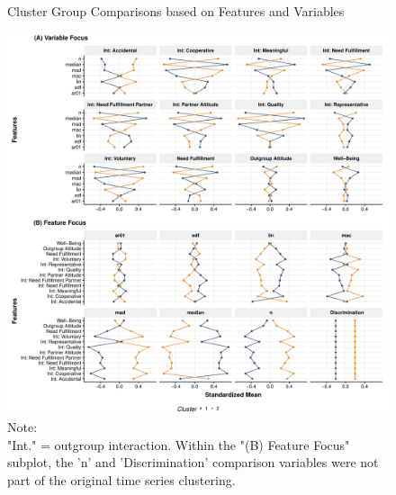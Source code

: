\begin{figure}[!ht] %
  \caption{Cluster Group Comparisons based on Features and Variables}
  \label{fig:clusterFeatVar}
  \centering\includegraphics[width=\textwidth]{figures/clusterFeatVarComb.pdf}
  \caption*{Note: \\
  "Int." = outgroup interaction. Within the "(B) Feature Focus" subplot, the 'n' and 'Discrimination' comparison variables were not part of the original time series clustering.}
\end{figure}

